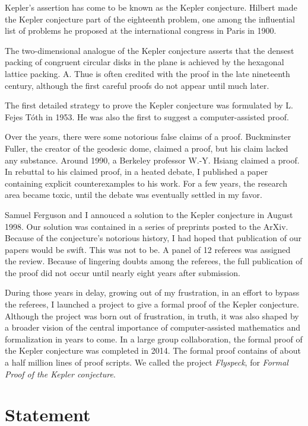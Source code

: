 \documentclass{amsart}
\begin{document}
Kepler's assertion has come to be known as the Kepler conjecture.
Hilbert made the Kepler conjecture part of the eighteenth problem, one among
the influential list of problems he proposed at the international
congress in Paris in 1900.

The two-dimensional analogue of the Kepler conjecture asserts that the
densest packing of congruent circular disks in the plane is achieved
by the hexagonal lattice packing.  A. Thue is often credited with the
proof in the late nineteenth century, although the first careful
proofs do not appear until much later.

The first detailed strategy to prove the Kepler conjecture was
formulated by L. Fejes T\'oth in 1953.  He was also the first to
suggest a computer-assisted proof.

Over the years, there were some notorious false claims of a proof.
Buckminster Fuller, the creator of the geodesic dome, claimed a proof,
but his claim lacked any substance.  Around 1990, a Berkeley professor
W.-Y. Hsiang claimed a proof.  In rebuttal to his claimed proof, in a
heated debate, I published a paper containing explicit counterexamples
to his work.  For a few years, the research area became toxic, until
the debate was eventually settled in my favor.

Samuel Ferguson and I annouced a solution to the Kepler conjecture in
August 1998.  Our solution was contained in a series of preprints
posted to the ArXiv.  Because of the conjecture's notorious history, I
had hoped that publication of our papers would be swift. This was not
to be.  A panel of 12 referees was assigned the review.  Because of
lingering doubts among the referees, the full publication of the proof
did not occur until nearly eight years after submission.

During those years in delay, growing out of my frustration, in an
effort to bypass the referees, I launched a project to give a formal
proof of the Kepler conjecture.  Although the project was born out of
frustration, in truth, it was also shaped by a broader vision of the
central importance of computer-assisted mathematics and formalization
in years to come.  In a large group collaboration, the formal proof of
the Kepler conjecture was completed in 2014.  The formal proof
contains of about a half million lines of proof scripts.  We called
the project \emph{Flyspeck}, for \emph{Formal Proof of the Kepler
  conjecture}.

\section{Statement}
\end{document}
